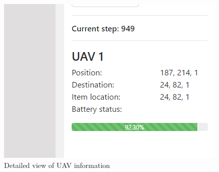 	\begin{figure}[htbp]\label{fig:uav_detail}
		\centering
		\includegraphics[scale=0.5]{images/uav_detail.png}
		\caption{Detailed view of UAV information}
	\end{figure}


